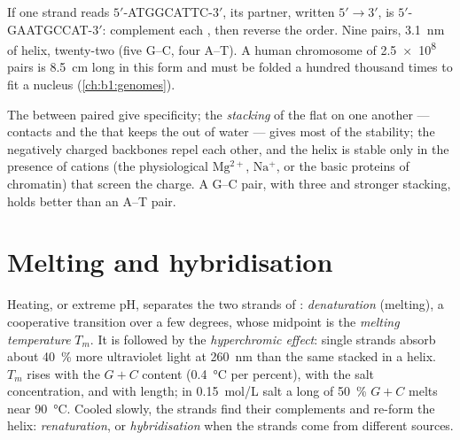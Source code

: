 \begin{example}\label{ex:b1:nucleic-acids:complement}
If one strand reads $5'$-ATGGCATTC-$3'$, its partner, written
$5' \to 3'$, is $5'$-GAATGCCAT-$3'$: complement each , then reverse
the order. Nine pairs, \qty{3.1}{nm} of helix, twenty-two  (five G--C, four A--T). A human chromosome of \num{2.5e8} pairs
is \qty{8.5}{cm} long in this form and must be folded a hundred
thousand times to fit a nucleus (\cref{ch:b1:genomes}).
\end{example}

\begin{proposition}\label{prop:b1:nucleic-acids:stability}
The  between paired  give specificity; the
\emph{stacking} of the flat  on one another
---  contacts and the  that keeps the
 out of water --- gives most of the stability; the negatively
charged backbones repel each other, and the helix is stable only in the
presence of cations (the physiological $\mathrm{Mg^{2+}}$,
$\mathrm{Na^+}$, or the basic proteins of chromatin) that screen the
charge. A G--C pair, with three  and stronger stacking,
holds better than an A--T pair.
\end{proposition}

\section{Melting and hybridisation}

\begin{definition}\label{def:b1:nucleic-acids:melting}
Heating, or extreme pH, separates the two strands of :
\emph{denaturation} (melting), a cooperative
transition over a few degrees, whose midpoint is the \emph{melting
temperature} $T_m$. It is followed by the
\emph{hyperchromic effect}: single strands absorb about \qty{40}{\%}
more ultraviolet light at \qty{260}{nm} than the same  stacked in
a helix. $T_m$ rises with the $G + C$ content (\qty{0.4}{\celsius} per
percent), with the salt concentration, and with length; in
\qty{0.15}{mol/L} salt a long  of \qty{50}{\%} $G + C$ melts near
\qty{90}{\celsius}. Cooled slowly, the strands find their complements
and re-form the helix: \emph{renaturation}, or \emph{hybridisation}
when the strands come from different sources.
\end{definition}

